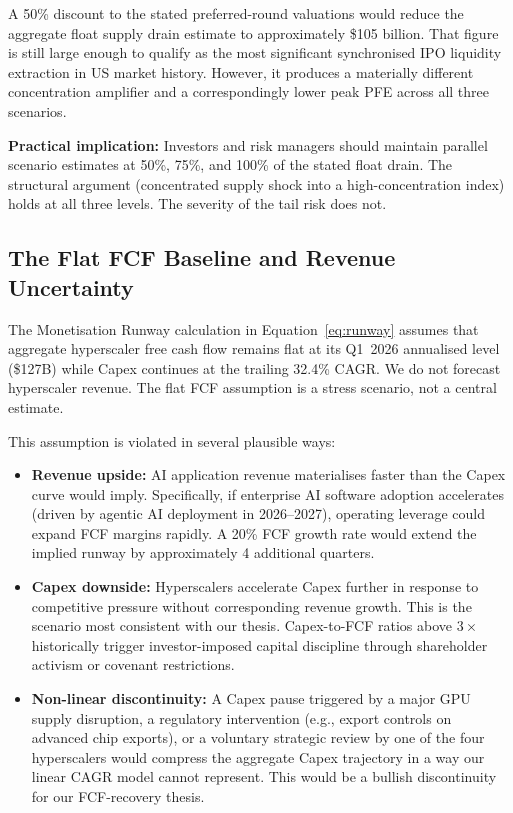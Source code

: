 A 50\% discount to the stated preferred-round valuations would reduce the aggregate
float supply drain estimate to approximately \$105 billion. That figure is still
large enough to qualify as the most significant synchronised IPO liquidity extraction
in US market history. However, it produces a materially different concentration
amplifier and a correspondingly lower peak PFE across all three scenarios.

\textbf{Practical implication:} Investors and risk managers should maintain parallel
scenario estimates at 50\%, 75\%, and 100\% of the stated float drain. The structural
argument (concentrated supply shock into a high-concentration index) holds at all three
levels. The severity of the tail risk does not.

\subsection{The Flat FCF Baseline and Revenue Uncertainty}

The Monetisation Runway calculation in Equation~\ref{eq:runway} assumes that aggregate
hyperscaler free cash flow remains flat at its Q1~2026 annualised level (\$127B) while
Capex continues at the trailing 32.4\% CAGR. We do not forecast hyperscaler revenue.
The flat FCF assumption is a stress scenario, not a central estimate.

This assumption is violated in several plausible ways:

\begin{itemize}
  \item \textbf{Revenue upside:} AI application revenue materialises faster than the
        Capex curve would imply. Specifically, if enterprise AI software adoption
        accelerates (driven by agentic AI deployment in 2026--2027), operating
        leverage could expand FCF margins rapidly. A 20\% FCF growth rate would
        extend the implied runway by approximately 4 additional quarters.
  \item \textbf{Capex downside:} Hyperscalers accelerate Capex further in response to
        competitive pressure without corresponding revenue growth. This is the scenario
        most consistent with our thesis. Capex-to-FCF ratios above $3\times$
        historically trigger investor-imposed capital discipline through shareholder
        activism or covenant restrictions.
  \item \textbf{Non-linear discontinuity:} A Capex pause triggered by a major GPU
        supply disruption, a regulatory intervention (e.g., export controls on advanced
        chip exports), or a voluntary strategic review by one of the four hyperscalers
        would compress the aggregate Capex trajectory in a way our linear CAGR model
        cannot represent. This would be a bullish discontinuity for our
        FCF-recovery thesis.
\end{itemize}

